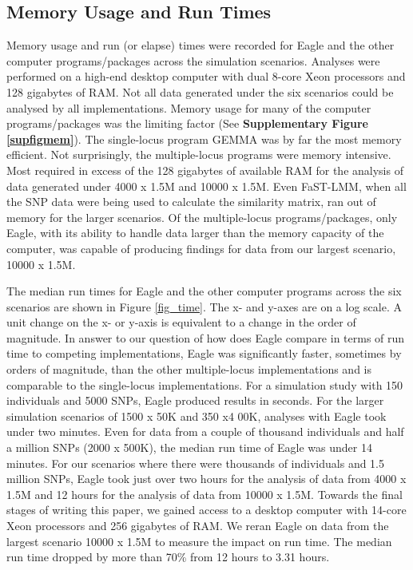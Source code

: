\documentclass{article}
\begin{document}
 



\subsection{Memory Usage and Run Times}

Memory usage and run (or elapse) times were recorded for Eagle and the other computer programs/packages across the simulation scenarios. 
Analyses were performed on a high-end desktop computer with dual 8-core Xeon processors and 128 gigabytes of RAM. Not all data generated under the six scenarios could be analysed by all implementations. Memory usage 
for many of the computer programs/packages was the limiting factor (See {\bf Supplementary Figure \ref{supfigmem}}).  The single-locus program GEMMA was by 
far the most memory efficient. Not surprisingly, the multiple-locus programs were memory intensive. Most required in 
excess of the 128 gigabytes of available RAM for the analysis of data generated under 4000 x 1.5M and 10000 x 1.5M.  
Even FaST-LMM, when all the SNP data were being used to calculate the similarity matrix, ran out of memory for the larger scenarios.
Of the multiple-locus programs/packages, only Eagle,  
with its ability to handle data larger than the memory capacity of the computer, was capable of producing findings 
for data from our largest scenario, 10000 x 1.5M. 


The median run times for Eagle and the other computer programs across the six scenarios are shown in Figure \ref{fig_time}. 
The x- and y-axes are on a log scale.  A unit change on the x- or y-axis is equivalent to a change in the order of magnitude.  
In answer to our question of how does Eagle compare in terms of run time to competing implementations, 
Eagle was significantly faster, sometimes by orders of magnitude,  than the other multiple-locus
 implementations and is comparable to the single-locus implementations. For a simulation study with 150 individuals and 
 5000 SNPs, Eagle produced results in seconds.  For the larger simulation scenarios of 1500 x  50K and 350 x4 00K, 
 analyses with Eagle took under two minutes. Even for data from a couple of thousand individuals and half a million 
 SNPs (2000 x 500K), the median run time of Eagle was under 14 minutes. For our scenarios where there 
 were thousands of individuals and 1.5 million SNPs, Eagle took just over two hours for the analysis of data from 
 4000 x 1.5M and  12 hours for the analysis of data from 10000 x 1.5M. 
 Towards the final stages of writing this paper, 
 we gained access to a desktop computer with 14-core Xeon processors and 256 gigabytes of RAM. We reran Eagle on data from the largest
  scenario 10000 x 1.5M to measure the impact on run time. The median run time dropped by more than 70\% 
  from 12 hours to 3.31 hours. 
 
\end{document}
